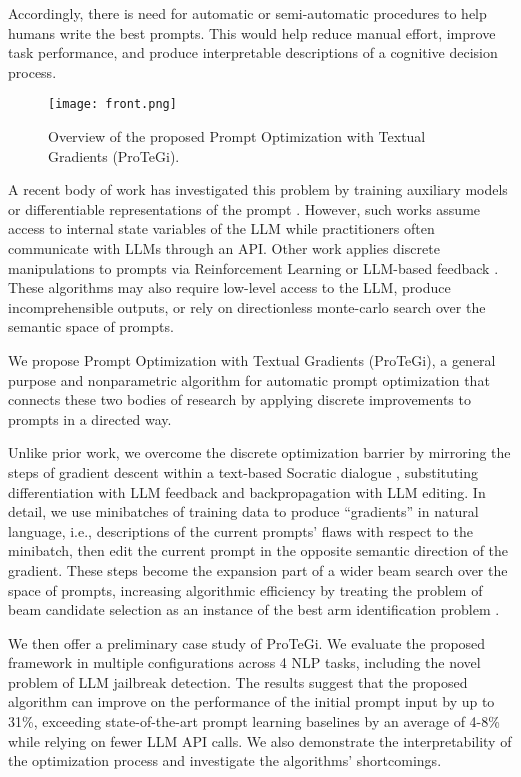 Accordingly, there is need for automatic or semi-automatic procedures to help humans write the best prompts. This would help reduce manual effort, improve task performance, and produce interpretable descriptions of a cognitive decision process.

\begin{figure}
\centering
\texttt{[image: front.png]}
\caption{Overview of the proposed Prompt Optimization with Textual Gradients (ProTeGi).}
\label{fig:firstpage}
\end{figure}

A recent body of work has investigated this problem by training auxiliary models or differentiable representations of the prompt \cite{qin2021learning,deng2022rlprompt}. However, such works assume access to internal state variables of the LLM  \cite{shin2020autoprompt,lester2021power} while practitioners often communicate with LLMs through an API. Other work applies discrete manipulations to prompts via Reinforcement Learning or LLM-based feedback \cite{zhang2023tempera,zhou2022large}. These algorithms may also require low-level access to the LLM, produce incomprehensible outputs, or rely on directionless monte-carlo search over the semantic space of prompts.%

We propose Prompt Optimization with Textual Gradients (ProTeGi), a general purpose and nonparametric algorithm for automatic prompt optimization that connects these two bodies of research by applying discrete improvements to prompts in a directed way. 

Unlike prior work, we overcome the discrete optimization barrier by mirroring the steps of gradient descent within a text-based Socratic dialogue \cite{zeng2022socratic}, substituting differentiation with LLM feedback and backpropagation with LLM editing.
In detail, we use minibatches of training data to produce ``gradients'' in natural language, i.e., descriptions of the current prompts' flaws with respect to the minibatch, then edit the current prompt in the opposite semantic direction of the gradient. These steps become the expansion part of a wider beam search over the space of prompts, increasing algorithmic efficiency by treating the problem of beam candidate selection as an instance of the best arm identification problem \cite{audibert2010best}.

We then offer a preliminary case study of ProTeGi. We evaluate the proposed framework in multiple configurations across 4 NLP tasks, including the novel problem of LLM jailbreak detection. The results suggest that the proposed algorithm can improve on the performance of the initial prompt input by up to 31\%, exceeding state-of-the-art prompt learning baselines by an average of 4-8\% while relying on fewer LLM API calls. We also demonstrate the interpretability of the optimization process and investigate the algorithms' shortcomings.

